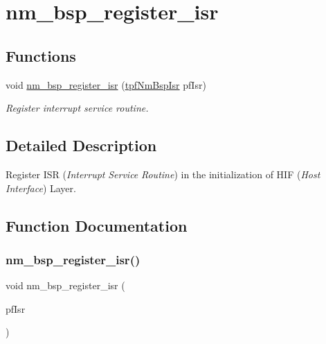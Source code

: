 \hypertarget{group__NmBspRegisterFn}{}\section{nm\+\_\+bsp\+\_\+register\+\_\+isr}
\label{group__NmBspRegisterFn}
\subsection*{Functions}
\begin{DoxyCompactItemize}
\item 
void \hyperlink{group__NmBspRegisterFn_ga1b42af0f91da07772d2d5c871c9c3e62}{nm\+\_\+bsp\+\_\+register\+\_\+isr} (\hyperlink{group__BSPDefine_gab061a1639662a3114b4c8b3b39bd6848}{tpf\+Nm\+Bsp\+Isr} pf\+Isr)
\begin{DoxyCompactList}\small\item\em Register interrupt service routine. \end{DoxyCompactList}\end{DoxyCompactItemize}


\subsection{Detailed Description}
Register I\+SR ({\itshape Interrupt} {\itshape Service} {\itshape Routine}) in the initialization of H\+IF ({\itshape Host} {\itshape Interface}) Layer. 

\subsection{Function Documentation}
\mbox{\label{group__NmBspRegisterFn_ga1b42af0f91da07772d2d5c871c9c3e62}} 
\subsubsection{\texorpdfstring{nm\+\_\+bsp\+\_\+register\+\_\+isr()}{nm\_bsp\_register\_isr()}}
{\footnotesize\ttfamily void nm\+\_\+bsp\+\_\+register\+\_\+isr (\begin{DoxyParamCaption}\item[{\hyperlink{group__BSPDefine_gab061a1639662a3114b4c8b3b39bd6848}{tpf\+Nm\+Bsp\+Isr}}]{pf\+Isr }\end{DoxyParamCaption})}



